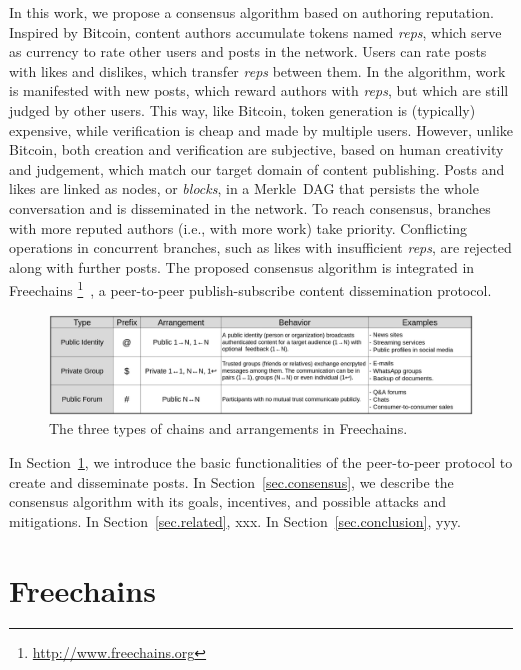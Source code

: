 \documentclass[10pt,journal,compsoc]{IEEEtran}
\newcommand{\FC} {Freechains\xspace}
\begin{document}
In this work, we propose a consensus algorithm based on authoring reputation.
Inspired by Bitcoin, content authors accumulate tokens named \emph{reps}, which
serve as currency to rate other users and posts in the network.
Users can rate posts with likes and dislikes, which transfer \emph{reps}
between them.
In the algorithm, work is manifested with new posts, which reward authors with
\emph{reps}, but which are still judged by other users.
This way, like Bitcoin, token generation is (typically) expensive, while
verification is cheap and made by multiple users.
However, unlike Bitcoin, both creation and verification are subjective, based
on human creativity and judgement, which match our target domain of content
publishing.
Posts and likes are linked as nodes, or \emph{blocks}, in a Merkle~DAG that
persists the whole conversation and is disseminated in the network.
To reach consensus, branches with more reputed authors (i.e., with more work)
take priority.
Conflicting operations in concurrent branches, such as likes with insufficient
\emph{reps}, are rejected along with further posts.
The proposed consensus algorithm is integrated in Freechains%
\footnote{\url{http://www.freechains.org}}~\cite{fcs.sbseg20},
a peer-to-peer publish-subscribe content dissemination protocol.

\begin{figure}[ht]
\centering
\includegraphics[width=\textwidth]{arrangements.png}
%
%
\caption{The three types of chains and arrangements in \FC.}
\label{fig.table}
\end{figure}

In Section~\ref{sec.freechains}, we introduce the basic functionalities of
the peer-to-peer protocol to create and disseminate posts.
In Section~\ref{sec.consensus}, we describe the consensus algorithm with its
goals, incentives, and possible attacks and mitigations.
In Section~\ref{sec.related}, xxx.
In Section~\ref{sec.conclusion}, yyy.

\section{Freechains}
\label{sec.freechains}
\end{document}
